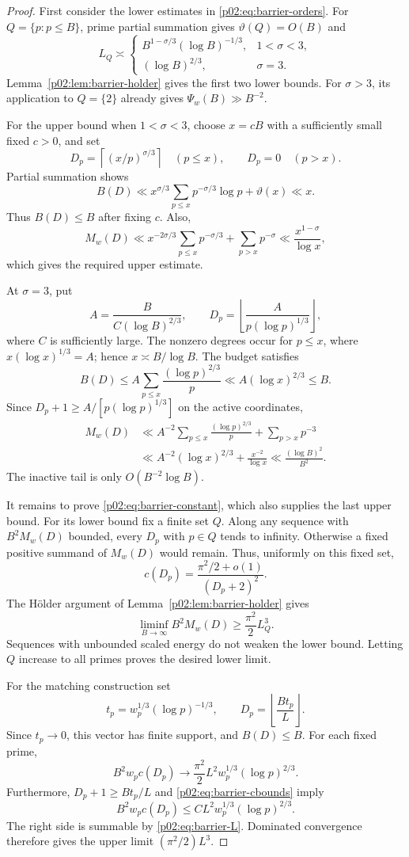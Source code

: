 \documentclass[11pt,letterpaper]{article}
\theoremstyle{definition}
\theoremstyle{remark}
\newcommand{\1}{\mathbf 1}
\begin{document}
\begin{proof}
First consider the lower estimates in \eqref{p02:eq:barrier-orders}.
For $Q=\{p:p\le B\}$, prime partial summation gives
$\vartheta(Q)=O(B)$ and
\[
 L_Q\asymp
 \begin{cases}
 B^{1-\sigma/3}(\log B)^{-1/3},&1<\sigma<3,\\
 (\log B)^{2/3},&\sigma=3.
 \end{cases}
\]
Lemma~\ref{p02:lem:barrier-holder} gives the first two lower bounds.
For $\sigma>3$, its application to $Q=\{2\}$ already gives
$\Psi_w(B)\gg B^{-2}$.

For the upper bound when $1<\sigma<3$, choose $x=cB$ with a sufficiently
small fixed $c>0$, and set
\[
 D_p=\left\lceil(x/p)^{\sigma/3}\right\rceil\quad(p\le x),
 \qquad D_p=0\quad(p>x).
\]
Partial summation shows
\[
 B(D)\ll x^{\sigma/3}\sum_{p\le x}p^{-\sigma/3}\log p
          +\vartheta(x)\ll x.
\]
Thus $B(D)\le B$ after fixing $c$. Also,
\[
 M_w(D)\ll
 x^{-2\sigma/3}\sum_{p\le x}p^{-\sigma/3}
 +\sum_{p>x}p^{-\sigma}
 \ll\frac{x^{1-\sigma}}{\log x},
\]
which gives the required upper estimate.

At $\sigma=3$, put
\[
 A=\frac{B}{C(\log B)^{2/3}},\qquad
 D_p=\left\lfloor\frac{A}{p(\log p)^{1/3}}\right\rfloor,
\]
where $C$ is sufficiently large. The nonzero degrees occur for
$p\le x$, where $x(\log x)^{1/3}=A$; hence
$x\asymp B/\log B$. The budget satisfies
\[
 B(D)\le A\sum_{p\le x}\frac{(\log p)^{2/3}}p
 \ll A(\log x)^{2/3}\le B.
\]
Since $D_p+1\ge A/[p(\log p)^{1/3}]$ on the active coordinates,
\begin{align*}
 M_w(D)
 &\ll A^{-2}\sum_{p\le x}\frac{(\log p)^{2/3}}p
               +\sum_{p>x}p^{-3}\\
 &\ll A^{-2}(\log x)^{2/3}+\frac{x^{-2}}{\log x}
 \ll\frac{(\log B)^2}{B^2}.
\end{align*}
The inactive tail is only $O(B^{-2}\log B)$.

It remains to prove \eqref{p02:eq:barrier-constant}, which also supplies the
last upper bound. For its lower bound fix a finite set $Q$. Along any
sequence with $B^2M_w(D)$ bounded, every $D_p$ with $p\in Q$ tends to
infinity. Otherwise a fixed positive summand of $M_w(D)$ would remain.
Thus, uniformly on this fixed set,
\[
 c(D_p)=\frac{\pi^2/2+o(1)}{(D_p+2)^2}.
\]
The H\"older argument of Lemma~\ref{p02:lem:barrier-holder} gives
\[
 \liminf_{B\to\infty}B^2M_w(D)\ge\frac{\pi^2}{2}L_Q^3.
\]
Sequences with unbounded scaled energy do not weaken the lower bound.
Letting $Q$ increase to all primes proves the desired lower limit.

For the matching construction set
\[
 t_p=w_p^{1/3}(\log p)^{-1/3},\qquad
 D_p=\left\lfloor\frac{Bt_p}{L}\right\rfloor.
\]
Since $t_p\to0$, this vector has finite support, and $B(D)\le B$.
For each fixed prime,
\[
 B^2w_pc(D_p)\longrightarrow
 \frac{\pi^2}{2}L^2w_p^{1/3}(\log p)^{2/3}.
\]
Furthermore, $D_p+1\ge Bt_p/L$ and \eqref{p02:eq:barrier-cbounds} imply
\[
 B^2w_pc(D_p)\le C L^2w_p^{1/3}(\log p)^{2/3}.
\]
The right side is summable by \eqref{p02:eq:barrier-L}. Dominated convergence
therefore gives the upper limit $(\pi^2/2)L^3$.
\end{proof}
\end{document}
